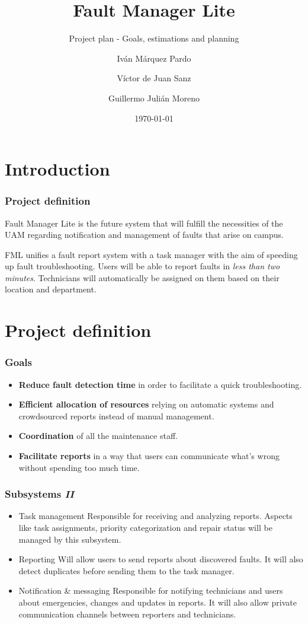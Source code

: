 \documentclass[10pt, compress,usetitleprogressbar,aspectratio=1610]{beamer}
\title{Fault Manager Lite}
\subtitle{Project plan - Goals, estimations and planning}
\date{\today}
\author{Iván Márquez Pardo \and Víctor de Juan Sanz \and Guillermo Julián Moreno}
\institute{Triforce}
\begin{document}
\maketitle

\tableofcontents

\section{Introduction}
\begin{frame}[fragile]
\frametitle{Project definition}

Fault Manager Lite is the future system that will fulfill the necessities of the UAM regarding notification and management of faults that arise on campus.

FML unifies a fault report system with a task manager with the aim of speeding up fault troubleshooting. Users will be able to report faults in \emph{less than two minutes}. Technicians will automatically be assigned on them based on their location and department.
\end{frame}

\section{Project definition}

\begin{frame}
\frametitle{Goals}

\begin{itemize}
\item \textbf{Reduce fault detection time} in order to facilitate a quick troubleshooting.
\item \textbf{Efficient allocation of resources} relying on automatic systems and crowdsourced reports instead of manual management.
\item \textbf{Coordination} of all the maintenance staff.
\item \textbf{Facilitate reports} in a way that users can communicate what's wrong without spending too much time.
\end{itemize}
\end{frame}

\begin{frame}
\frametitle{Subsystems \hfill \emph{II}}
\begin{itemize}
\item \alert{Task management} Responsible for receiving and analyzing reports. Aspects like task assignments, priority categorization and repair status will be managed by this subsystem.
\item \alert{Reporting} Will allow users to send reports about discovered faults. It will also detect duplicates before sending them to the task manager.
\item \alert{Notification \& messaging} Responsible for notifying technicians and users about emergencies, changes and updates in reports. It will also allow private communication channels between reporters and technicians.
\end{itemize}
\end{frame}
\end{document}
